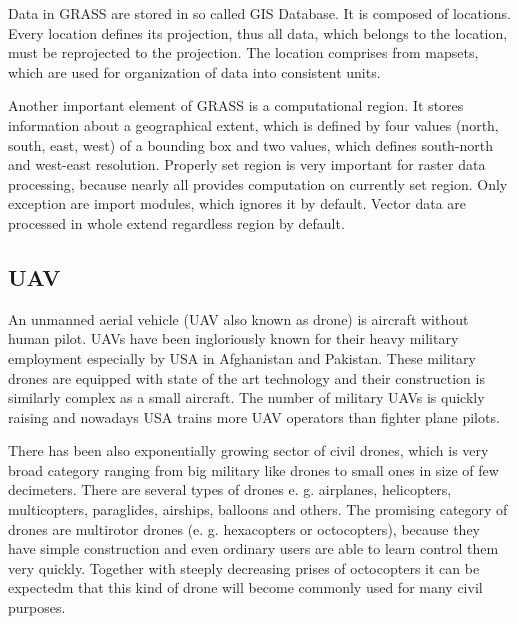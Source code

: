 \documentclass[a4paper,12pt]{article}
\begin{document}

Data in GRASS are stored in so called GIS Database. It is composed of locations. Every location 
defines its projection, thus all data, which belongs to the location, must be reprojected to the 
projection. The location comprises from mapsets, which are used for organization 
of data into consistent units. 





Another important element of GRASS is a computational region. It stores information about a geographical
extent, which is defined by four values (north, south, east, west) of a bounding box and 
two values, which defines south-north and west-east resolution. Properly set region is 
very important for raster data processing, because nearly all provides computation 
on currently set region. Only exception are import modules, which ignores it by default.
Vector data are processed in whole extend regardless region by default.

\subsection{UAV}


An unmanned aerial vehicle (UAV also known as drone) is aircraft without human pilot.  UAVs have been ingloriously known for
their heavy military employment especially by USA in Afghanistan and Pakistan. These military drones are equipped with state of the art 
technology and their construction is similarly complex as a small aircraft.  
The number of military UAVs is quickly raising and nowadays USA trains more UAV operators than fighter plane pilots.


There has been also exponentially growing sector of civil drones, which is very broad category ranging
from big military like drones to small ones in size of few decimeters. There are several types of drones e. g. airplanes,
helicopters, multicopters, paraglides, airships, balloons and others. 
The promising category of drones are multirotor drones (e. g. hexacopters or octocopters), because they have simple construction and 
even ordinary users are able to learn control them very quickly. Together with steeply decreasing prises of octocopters it can be expectedm 
that this kind of drone will become commonly used for many civil purposes.
\end{document}
